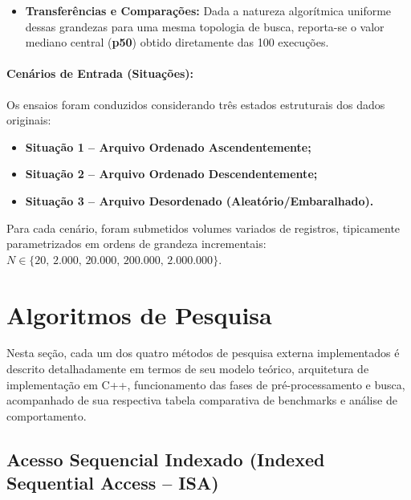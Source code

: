 \documentclass[12pt,a4paper]{article}
\begin{document}
\begin{enumerate}
\begin{itemize}
        \item \textbf{Transferências e Comparações:} Dada a natureza algorítmica uniforme dessas grandezas para uma mesma topologia de busca, reporta-se o valor mediano central (\textbf{p50}) obtido diretamente das 100 execuções.
    \end{itemize}
\end{enumerate}

\paragraph{Cenários de Entrada (Situações):}
Os ensaios foram conduzidos considerando três estados estruturais dos dados originais:
\begin{itemize}
    \item \textbf{Situação 1 -- Arquivo Ordenado Ascendentemente;}
    \item \textbf{Situação 2 -- Arquivo Ordenado Descendentemente;}
    \item \textbf{Situação 3 -- Arquivo Desordenado (Aleatório/Embaralhado).}
\end{itemize}
Para cada cenário, foram submetidos volumes variados de registros, tipicamente parametrizados em ordens de grandeza incrementais: $N \in \{20, \, 2.000, \, 20.000, \, 200.000, \, 2.000.000\}$.

\section{Algoritmos de Pesquisa}
\label{sec:algoritmos}

Nesta seção, cada um dos quatro métodos de pesquisa externa implementados é descrito detalhadamente em termos de seu modelo teórico, arquitetura de implementação em C++, funcionamento das fases de pré-processamento e busca, acompanhado de sua respectiva tabela comparativa de benchmarks e análise de comportamento.

\subsection{Acesso Sequencial Indexado (Indexed Sequential Access -- ISA)}
\label{subsec:isa}
\end{document}
